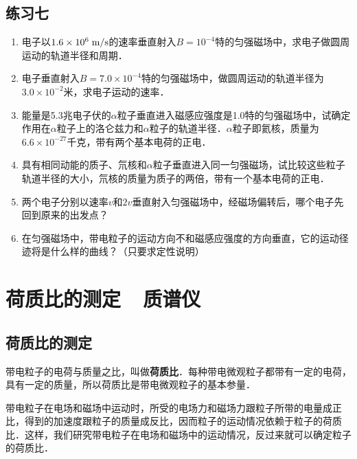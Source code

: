 \subsection*{练习七}
\begin{enumerate}
    \item 电子以$1.6\times10^6\;\text{m}/\text{s}$的速率垂直射入$B=10^{-4}$特的匀强磁场中，求电子做圆周运动的轨道半径和周期．
    \item 电子垂直射入$B=7.0\times10^{-4}$特的匀强磁场中，做圆周运动的轨道半径为$3.0\times10^{-2}$米，求电子运动的速率．
    \item 能量是5.3兆电子伏的$\alpha$粒子垂直进入磁感应强度是1.0特的匀强磁场中，试确定作用在$\alpha$粒子上的洛仑兹力和$\alpha$粒子的轨道半径．$\alpha$粒子即氦核，质量为$6.6\times10^{-27}$千克，带有两个基本电荷的正电．
    \item 具有相同动能的质子、氘核和$\alpha$粒子垂直进入同一匀强磁场，试比较这些粒子轨道半径的大小，氘核的质量为质子的两倍，带有一个基本电荷的正电．
    \item 两个电子分别以速率$v$和$2v$垂直射入匀强磁场中，经磁场偏转后，哪个电子先回到原来的出发点？
    \item 在匀强磁场中，带电粒子的运动方向不和磁感应强度的方向垂直，它的运动径迹将是什么样的曲线？（只要求定性说明）
\end{enumerate}


\section{荷质比的测定~~质谱仪}
\subsection{荷质比的测定}

带电粒子的电荷与质量之比，叫做\textbf{荷质比}．每种带电微观粒子都带有一定的电荷，具有一定的质量，所以荷质比是带电微观粒子的基本参量．

带电粒子在电场和磁场中运动时，所受的电场力和磁场力跟粒子所带的电量成正比，得到的加速度跟粒子的质量成反比，因而粒子的运动情况依赖于粒子的荷质比．这样，我们研究带电粒子在电场和磁场中的运动情况，反过来就可以确定粒子的荷质比．

